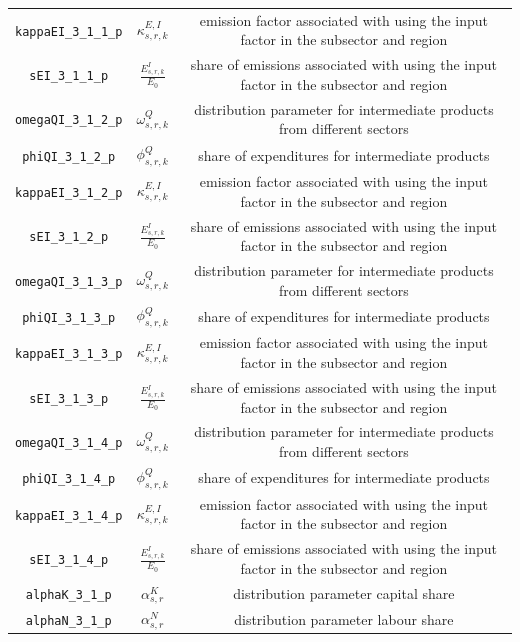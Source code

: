 \begin{center}
\begin{longtable}{ccc}
\texttt{kappaEI\_3\_1\_1\_p} & ${\kappa^{E,I}_{s,r,k}}$ & emission factor associated with using the input factor in the subsector and region\\
\texttt{sEI\_3\_1\_1\_p} & ${\frac{E^{I}_{s,r,k}}{E_0}}$ & share of emissions associated with using the input factor in the subsector and region\\
\texttt{omegaQI\_3\_1\_2\_p} & ${\omega^{Q}_{s,r,k}}$ & distribution parameter for intermediate products from different sectors\\
\texttt{phiQI\_3\_1\_2\_p} & ${\phi^{Q}_{s,r,k}}$ & share of expenditures for intermediate products\\
\texttt{kappaEI\_3\_1\_2\_p} & ${\kappa^{E,I}_{s,r,k}}$ & emission factor associated with using the input factor in the subsector and region\\
\texttt{sEI\_3\_1\_2\_p} & ${\frac{E^{I}_{s,r,k}}{E_0}}$ & share of emissions associated with using the input factor in the subsector and region\\
\texttt{omegaQI\_3\_1\_3\_p} & ${\omega^{Q}_{s,r,k}}$ & distribution parameter for intermediate products from different sectors\\
\texttt{phiQI\_3\_1\_3\_p} & ${\phi^{Q}_{s,r,k}}$ & share of expenditures for intermediate products\\
\texttt{kappaEI\_3\_1\_3\_p} & ${\kappa^{E,I}_{s,r,k}}$ & emission factor associated with using the input factor in the subsector and region\\
\texttt{sEI\_3\_1\_3\_p} & ${\frac{E^{I}_{s,r,k}}{E_0}}$ & share of emissions associated with using the input factor in the subsector and region\\
\texttt{omegaQI\_3\_1\_4\_p} & ${\omega^{Q}_{s,r,k}}$ & distribution parameter for intermediate products from different sectors\\
\texttt{phiQI\_3\_1\_4\_p} & ${\phi^{Q}_{s,r,k}}$ & share of expenditures for intermediate products\\
\texttt{kappaEI\_3\_1\_4\_p} & ${\kappa^{E,I}_{s,r,k}}$ & emission factor associated with using the input factor in the subsector and region\\
\texttt{sEI\_3\_1\_4\_p} & ${\frac{E^{I}_{s,r,k}}{E_0}}$ & share of emissions associated with using the input factor in the subsector and region\\
\texttt{alphaK\_3\_1\_p} & ${\alpha^{K}_{s,r}}$ & distribution parameter capital share\\
\texttt{alphaN\_3\_1\_p} & ${\alpha^{N}_{s,r}}$ & distribution parameter labour share\\

\end{longtable}
\end{center}
